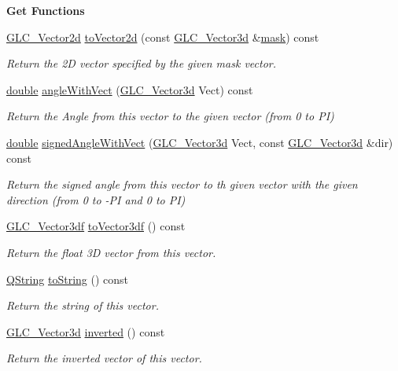 \begin{Indent}{\bf Get Functions}
\begin{DoxyCompactItemize}
\hyperlink{class_g_l_c___vector2d}{G\-L\-C\-\_\-\-Vector2d} \hyperlink{class_g_l_c___vector3d_aa5fc9a023459fb2adee19308aa85f54f}{to\-Vector2d} (const \hyperlink{class_g_l_c___vector3d}{G\-L\-C\-\_\-\-Vector3d} \&\hyperlink{glext_8h_a2e8825c19147a8250013df8e4275f5b6}{mask}) const 
\begin{DoxyCompactList}\small\item\em Return the 2\-D vector specified by the given mask vector. \end{DoxyCompactList}\item 
\hyperlink{_super_l_u_support_8h_a8956b2b9f49bf918deed98379d159ca7}{double} \hyperlink{class_g_l_c___vector3d_a4aa103bfa4ca6472e574342973b5ddbe}{angle\-With\-Vect} (\hyperlink{class_g_l_c___vector3d}{G\-L\-C\-\_\-\-Vector3d} Vect) const 
\begin{DoxyCompactList}\small\item\em Return the Angle from this vector to the given vector (from 0 to P\-I) \end{DoxyCompactList}\item 
\hyperlink{_super_l_u_support_8h_a8956b2b9f49bf918deed98379d159ca7}{double} \hyperlink{class_g_l_c___vector3d_a95e13859853b15290bbe1538e71ad849}{signed\-Angle\-With\-Vect} (\hyperlink{class_g_l_c___vector3d}{G\-L\-C\-\_\-\-Vector3d} Vect, const \hyperlink{class_g_l_c___vector3d}{G\-L\-C\-\_\-\-Vector3d} \&dir) const 
\begin{DoxyCompactList}\small\item\em Return the signed angle from this vector to th given vector with the given direction (from 0 to -\/\-P\-I and 0 to P\-I) \end{DoxyCompactList}\item 
\hyperlink{class_g_l_c___vector3df}{G\-L\-C\-\_\-\-Vector3df} \hyperlink{class_g_l_c___vector3d_a3883245faa3b177dfab45134b4b497b4}{to\-Vector3df} () const 
\begin{DoxyCompactList}\small\item\em Return the float 3\-D vector from this vector. \end{DoxyCompactList}\item 
\hyperlink{group___u_a_v_objects_plugin_gab9d252f49c333c94a72f97ce3105a32d}{Q\-String} \hyperlink{class_g_l_c___vector3d_af91132a4dcfa1c68224e4a846df6b87b}{to\-String} () const 
\begin{DoxyCompactList}\small\item\em Return the string of this vector. \end{DoxyCompactList}\item 
\hyperlink{class_g_l_c___vector3d}{G\-L\-C\-\_\-\-Vector3d} \hyperlink{class_g_l_c___vector3d_ad5122202fee8b0175a7b0c48bb59f963}{inverted} () const 
\begin{DoxyCompactList}\small\item\em Return the inverted vector of this vector. \end{DoxyCompactList}\end{DoxyCompactItemize}
\end{Indent}

